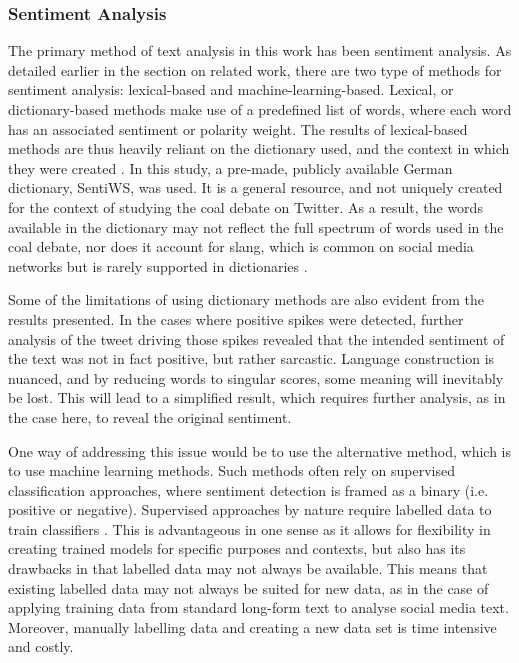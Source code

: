 \documentclass[12pt,onecolumn,twoside]{layout}
\begin{document}
\subsubsection*{Sentiment Analysis}
The primary method of text analysis in this work has been sentiment analysis. As detailed earlier in the section on related work, there are two type of methods for sentiment analysis: lexical-based and machine-learning-based. Lexical, or dictionary-based methods make use of a predefined list of words, where each word has an associated sentiment or polarity weight. The results of lexical-based methods are thus heavily reliant on the dictionary used, and the context in which they were created \citep{Goncalves2013}. In this study, a pre-made, publicly available German dictionary, SentiWS, was used. It is a general resource, and not uniquely created for the context of studying the coal debate on Twitter. As a result, the words available in the dictionary may not reflect the full spectrum of words used in the coal debate, nor does it account for slang, which is common on social media networks but is rarely supported in dictionaries \citep{Hu2013}.

Some of the limitations of using dictionary methods are also evident from the results presented. In the cases where positive spikes were detected, further analysis of the tweet driving those spikes revealed that the intended sentiment of the text was not in fact positive, but rather sarcastic. Language construction is nuanced, and by reducing words to singular scores, some meaning will inevitably be lost. This will lead to a simplified result, which requires further analysis, as in the case here, to reveal the original sentiment.

One way of addressing this issue would be to use the alternative method, which is to use machine learning methods. Such methods often rely on supervised classification approaches, where sentiment detection is framed as a binary (i.e. positive or negative). Supervised approaches by nature require labelled data to train classifiers \citep{Pang2002}. This is advantageous in one sense as it allows for flexibility in creating trained models for specific purposes and contexts, but also has its drawbacks in that labelled data may not always be available. This means that existing labelled data may not always be suited for new data, as in the case of applying training data from standard long-form text to analyse social media text. Moreover, manually labelling data and creating a new data set is time intensive and costly.
\end{document}
